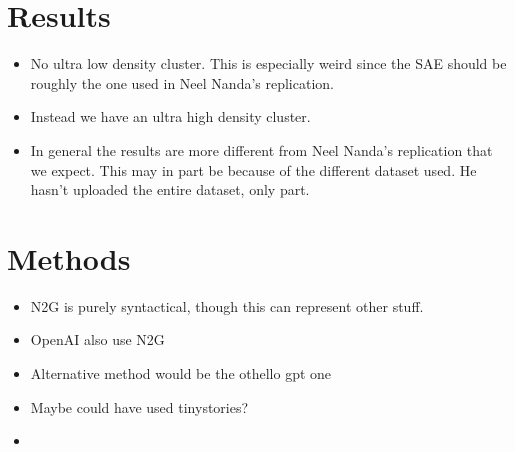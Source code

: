 \section{Results}
\begin{itemize}
    \item No ultra low density cluster. This is especially weird since the SAE should be roughly the one used in Neel Nanda's replication.
    \item Instead we have an ultra high density cluster.
    \item In general the results are more different from Neel Nanda's replication that we expect. This may in part be because of the different dataset used. He hasn't uploaded the entire dataset, only part.
\end{itemize}

\section{Methods}
\begin{itemize}
    \item N2G is purely syntactical, though this can represent other stuff.
    \item OpenAI also use N2G
    \item Alternative method would be the othello gpt one
    \item Maybe could have used tinystories?
    \item 
\end{itemize}